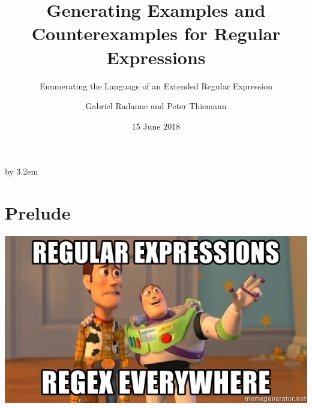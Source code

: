 \documentclass[pdftex,aspectratio=169]{beamer}
\begin{document}
\everymath{\displaystyle}


\title{Generating Examples and Counterexamples for Regular Expressions}
\subtitle{Enumerating the Language of an Extended Regular Expression}
\author[Thiemann]%
{Gabriel Radanne and Peter Thiemann}
\date[2018-06-15]{15 June 2018}

\makeatletter
\begin{frame}[plain,label=fp]
    \advance\textwidth by 3.2em\relax
    \begin{minipage}{\textwidth}\par%
      \maketitle
    \end{minipage}
    \hspace*{2.5em}%
\end{frame}
\makeatother 

\section{Prelude}

\begin{frame}
    \begin{center}
      \includegraphics[scale=0.8]{regular-expressions-regex-everywhere}
    \end{center}
\end{frame}
\end{document}
